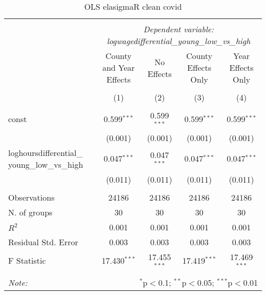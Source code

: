 \documentclass{report}
\begin{document}
\begin{table}[!htbp] \centering
  \caption{OLS elasigmaR clean covid}
\begin{tabular}{@{\extracolsep{5pt}}lcccc}
\\[-1.8ex]\hline
\hline \\[-1.8ex]
& \multicolumn{4}{c}{\textit{Dependent variable: logwagedifferential_young_low_vs_high}} \
\cr \cline{2-5}
\\[-1.8ex] & \multicolumn{1}{c}{County and Year Effects} & \multicolumn{1}{c}{No Effects} & \multicolumn{1}{c}{County Effects Only} & \multicolumn{1}{c}{Year Effects Only}  \\
\\[-1.8ex] & (1) & (2) & (3) & (4) \\
\hline \\[-1.8ex]
 const & 0.599$^{***}$ & 0.599$^{***}$ & 0.599$^{***}$ & 0.599$^{***}$ \\
& (0.001) & (0.001) & (0.001) & (0.001) \\
 loghoursdifferential_ young_low_vs_high & 0.047$^{***}$ & 0.047$^{***}$ & 0.047$^{***}$ & 0.047$^{***}$ \\
& (0.011) & (0.011) & (0.011) & (0.011) \\
\hline \\[-1.8ex]
 Observations & 24186 & 24186 & 24186 & 24186 \\
 N. of groups & 30 & 30 & 30 & 30 \\
 $R^2$ & 0.001 & 0.001 & 0.001 & 0.001 \\
 Residual Std. Error & 0.003 & 0.003 & 0.003 & 0.003 \\
 F Statistic & 17.430$^{***}$ & 17.455$^{***}$ & 17.419$^{***}$ & 17.469$^{***}$ \\
\hline
\hline \\[-1.8ex]
\textit{Note:} & \multicolumn{4}{r}{$^{*}$p$<$0.1; $^{**}$p$<$0.05; $^{***}$p$<$0.01} \\
\end{tabular}
\end{table}
\end{document}
